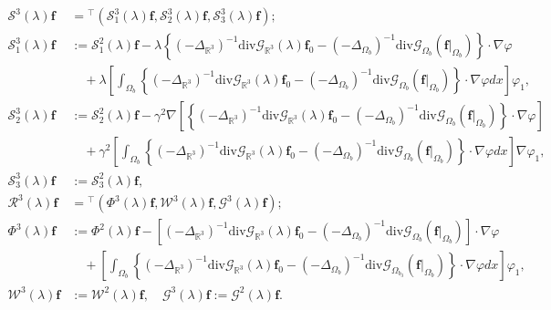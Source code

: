 \documentclass[dvipdfmx,12pt]{article}
\begin{document}
\begin{align*}
\mathcal{S}^{3}(\lambda)\mathbf{f}&={}^\top(\mathcal{S}_1^{3}(\lambda)\mathbf{f},\mathcal{S}_2^{3}(\lambda)\mathbf{f},\mathcal{S}_3^{3}(\lambda)\mathbf{f}); \\
\mathcal{S}_1^{3}(\lambda)\mathbf{f}&:=\mathcal{S}_1^2(\lambda)\mathbf{f}-\lambda\left\{(-\Delta_{\mathbb{R}^3})^{-1}\mathrm{div}\mathcal{G}_{\mathbb{R}^3}(\lambda)\mathbf{f}_0-(-\Delta_{\Omega_{b}})^{-1}\mathrm{div}\mathcal{G}_{\Omega_{b}}(\mathbf{f}|_{\Omega_{b}})\right\}\cdot\nabla\varphi \\
&\quad +\lambda\left[\int_{\Omega_{b}}\left\{(-\Delta_{\mathbb{R}^3})^{-1}\mathrm{div}\mathcal{G}_{\mathbb{R}^3}(\lambda)\mathbf{f}_0-(-\Delta_{\Omega_{b}})^{-1}\mathrm{div}\mathcal{G}_{\Omega_{b}}(\mathbf{f}|_{\Omega_{b}})\right\}\cdot\nabla\varphi dx\right] \varphi_1,\\
\mathcal{S}_2^{3}(\lambda)\mathbf{f}&:=\mathcal{S}_2^2(\lambda)\mathbf{f}-\gamma^2\nabla\left[\left\{(-\Delta_{\mathbb{R}^3})^{-1}\mathrm{div}\mathcal{G}_{\mathbb{R}^3}(\lambda)\mathbf{f}_0-(-\Delta_{\Omega_{b}})^{-1}\mathrm{div}\mathcal{G}_{\Omega_{b}}(\mathbf{f}|_{\Omega_{b}})\right\}\cdot\nabla\varphi\right] \\
&\quad +\gamma^2\left[\int_{\Omega_{b}}\left\{(-\Delta_{\mathbb{R}^3})^{-1}\mathrm{div}\mathcal{G}_{\mathbb{R}^3}(\lambda)\mathbf{f}_0-(-\Delta_{\Omega_{b}})^{-1}\mathrm{div}\mathcal{G}_{\Omega_{b}}(\mathbf{f}|_{\Omega_{b}})\right\}\cdot\nabla\varphi dx\right] \nabla\varphi_1,\\[1ex]
\mathcal{S}_3^{3}(\lambda)\mathbf{f}&:=\mathcal{S}_3^2(\lambda)\mathbf{f},\\
\mathcal{R}^{3}(\lambda)\mathbf{f}&={}^\top(\Phi^3(\lambda)\mathbf{f},\mathcal{W}^{3}(\lambda)\mathbf{f},\mathcal{G}^{3}(\lambda)\mathbf{f}); \\
\Phi^3(\lambda)\mathbf{f}&:=\Phi^2(\lambda)\mathbf{f}-\left[(-\Delta_{\mathbb{R}^3})^{-1}\mathrm{div}\mathcal{G}_{\mathbb{R}^3}(\lambda)\mathbf{f}_0-(-\Delta_{\Omega_{b}})^{-1}\mathrm{div}\mathcal{G}_{\Omega_{b}}(\mathbf{f}|_{\Omega_{b}})\right]\cdot\nabla\varphi \\
&\quad +\left[\int_{\Omega_{b}} \left\{(-\Delta_{\mathbb{R}^3})^{-1}\mathrm{div}\mathcal{G}_{\mathbb{R}^3}(\lambda)\mathbf{f}_0-(-\Delta_{\Omega_{b}})^{-1}\mathrm{div}\mathcal{G}_{\Omega_{b_3}}(\mathbf{f}|_{\Omega_{b}})\right\}\cdot\nabla\varphi dx\right] \varphi_1, \\
\mathcal{W}^3(\lambda)\mathbf{f}&:=\mathcal{W}^2(\lambda)\mathbf{f}, \quad
\mathcal{G}^3(\lambda)\mathbf{f}:=\mathcal{G}^2(\lambda)\mathbf{f}.
\end{align*}
\end{document}
